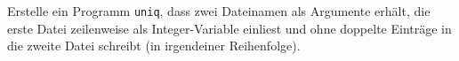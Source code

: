 \begin{aufg}
Erstelle ein Programm \verb|uniq|, dass zwei Dateinamen als Argumente erhält, die erste Datei zeilenweise als Integer-Variable einliest und ohne doppelte Einträge in die zweite Datei schreibt (in irgendeiner Reihenfolge).
\end{aufg}
